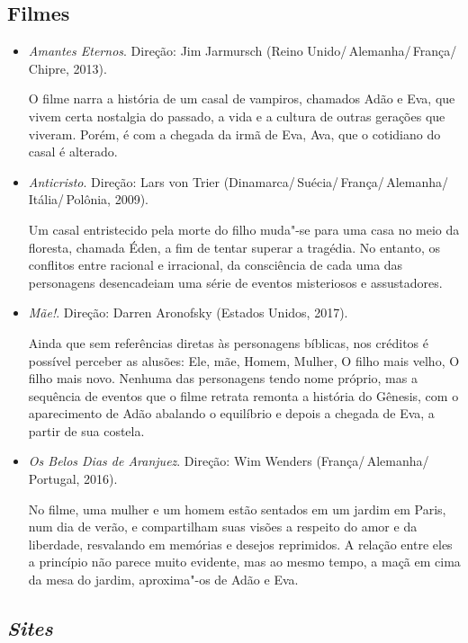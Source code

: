 \documentclass[12pt]{extarticle}
\begin{document}
\subsection{Filmes}

\begin{itemize}
\item\textit{Amantes Eternos}. Direção: Jim Jarmursch (Reino Unido/\,Alemanha/\,França/\,Chipre, 2013).

O filme narra a história de um casal de vampiros, chamados Adão e Eva, que vivem certa nostalgia 
do passado, a vida e a cultura de outras gerações que viveram. Porém, é com a chegada da irmã de Eva, Ava, 
que o cotidiano do casal é alterado.

\item\textit{Anticristo}. Direção: Lars von Trier (Dinamarca/\,Suécia/\,França/\,Alemanha/\,Itália/\,Polônia, 2009). 

Um casal entristecido pela morte do filho muda"-se para uma casa no meio da floresta, chamada Éden, 
a fim de tentar superar a tragédia. No entanto, os conflitos entre racional e irracional, da consciência 
de cada uma das personagens desencadeiam uma série de eventos misteriosos e assustadores.

\item\textit{Mãe!}. Direção: Darren Aronofsky (Estados Unidos, 2017).

Ainda que sem referências diretas às personagens bíblicas, nos créditos é possível perceber as alusões: 
Ele, mãe, Homem, Mulher, O filho mais velho, O filho mais novo. Nenhuma das personagens tendo nome próprio, 
mas a sequência de eventos que o filme retrata remonta a história do Gênesis, com o aparecimento de Adão 
abalando o equilíbrio e depois a chegada de Eva, a partir de sua costela.

\item\textit{Os Belos Dias de Aranjuez}. Direção: Wim Wenders (França/\,Alemanha/\,Portugal, 2016).

No filme, uma mulher e um homem estão sentados em um jardim em Paris, num dia de verão, e 
compartilham suas visões a respeito do amor e da liberdade, resvalando em memórias e desejos 
reprimidos. A relação entre eles a princípio não parece muito evidente, mas ao mesmo tempo, 
a maçã em cima da mesa do jardim, aproxima"-os de Adão e Eva.
\end{itemize}


\subsection{\emph{Sites}}
\end{document}
